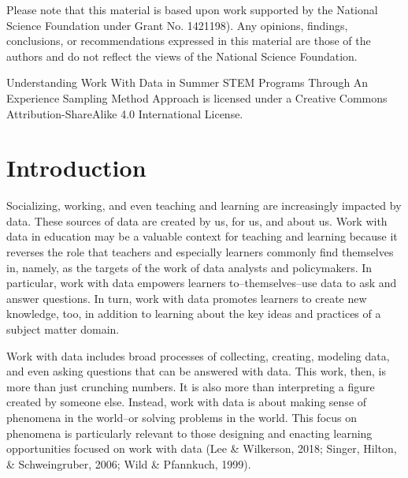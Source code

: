 \documentclass[]{msu-thesis}
\theoremstyle{definition}
\theoremstyle{definition}
\theoremstyle{definition}
\theoremstyle{remark}
\begin{document}
Please note that this material is based upon work supported by the National Science Foundation under Grant No. 1421198). Any opinions, findings, conclusions, or recommendations expressed in this material are those of the authors and do not reflect the views of the National Science Foundation.

Understanding Work With Data in Summer STEM Programs Through An Experience Sampling Method Approach is licensed under a Creative Commons Attribution-ShareAlike 4.0 International License.
\clearpage

\SingleSpacing
\tableofcontents* %
\clearpage
\listoftables %
\clearpage
\listoffigures %
\mainmatter
%

\chapter{Introduction}\label{intro}

\DoubleSpacing

Socializing, working, and even teaching and learning are increasingly
impacted by data. These sources of data are created by us, for us, and
about us. Work with data in education may be a valuable context for
teaching and learning because it reverses the role that teachers and
especially learners commonly find themselves in, namely, as the targets
of the work of data analysts and policymakers. In particular, work with
data empowers learners to--themselves--use data to ask and answer
questions. In turn, work with data promotes learners to create new
knowledge, too, in addition to learning about the key ideas and
practices of a subject matter domain.

Work with data includes broad processes of collecting, creating,
modeling data, and even asking questions that can be answered with data.
This work, then, is more than just crunching numbers. It is also more
than interpreting a figure created by someone else. Instead, work with
data is about making sense of phenomena in the world--or solving
problems in the world. This focus on phenomena is particularly relevant
to those designing and enacting learning opportunities focused on work
with data (Lee \& Wilkerson, 2018; Singer, Hilton, \& Schweingruber,
2006; Wild \& Pfannkuch, 1999).
\end{document}
